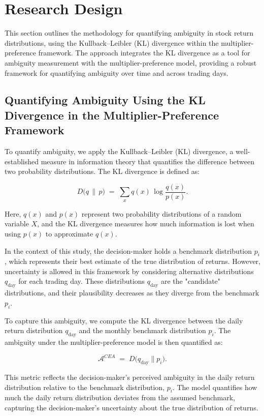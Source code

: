 \documentclass[preprint,12pt,authoryear]{elsarticle}
\begin{document}
\section{Research Design}
This section outlines the methodology for quantifying ambiguity in stock return distributions, using the Kullback–Leibler (KL) divergence within the multiplier-preference framework. The approach integrates the KL divergence as a tool for ambiguity measurement with the multiplier-preference model, providing a robust framework for quantifying ambiguity over time and across trading days.

\subsection{Quantifying Ambiguity Using the KL Divergence in the Multiplier-Preference Framework}

To quantify ambiguity, we apply the Kullback--Leibler (KL) divergence, a well-established measure in information theory that quantifies the difference between two probability distributions. The KL divergence is defined as:

\[
D\bigl(q \,\|\, p\bigr) \;=\; \sum_{x} q(x)\,\log\!\frac{q(x)}{p(x)}.
\]

Here, \(q(x)\) and \(p(x)\) represent two probability distributions of a random variable \(X\), and the KL divergence measures how much information is lost when using \(p(x)\) to approximate \(q(x)\).

In the context of this study, the decision-maker holds a benchmark distribution \(p_i\), which represents their best estimate of the true distribution of returns. However, uncertainty is allowed in this framework by considering alternative distributions \(q_{\text{day}}\) for each trading day. These distributions \(q_{\text{day}}\) are the "candidate" distributions, and their plausibility decreases as they diverge from the benchmark \(p_i\).

To capture this ambiguity, we compute the KL divergence between the daily return distribution \(q_{\text{day}}\) and the monthly benchmark distribution \(p_i\). The ambiguity under the multiplier-preference model is then quantified as:

\[
\mathcal{A}^{CEA} \;=\; D\bigl(q_{\mathrm{day}} \parallel p_i\bigr).
\]

This metric reflects the decision-maker's perceived ambiguity in the daily return distribution relative to the benchmark distribution, \(p_i\). The model quantifies how much the daily return distribution deviates from the assumed benchmark, capturing the decision-maker's uncertainty about the true distribution of returns.
\end{document}
